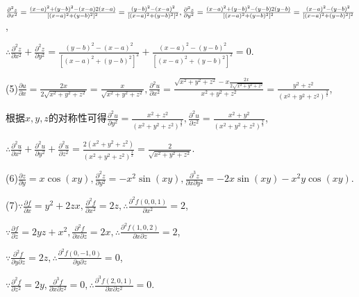 \documentclass[12pt,UTF8]{ctexart}
\begin{document}
\begin{enumerate}
$\frac{\partial^2z}{\partial x^2}=\frac{(x-a)^2+(y-b)^2-(x-a)2(x-a)}{[(x-a)^2+(y-b)^2]^2}=\frac{(y-b)^2-(x-a)^2}{[(x-a)^2+(y-b)^2]^2},\\
\frac{\partial^2z}{\partial y^2}=\frac{(x-a)^2+(y-b)^2-(y-b)2(y-b)}{[(x-a)^2+(y-b)^2]^2}=\frac{(x-a)^2-(y-b)^2}{[(x-a)^2+(y-b)^2]^2}$,

$\therefore\frac{\partial^2z}{\partial x^2}+\frac{\partial^2z}{\partial y^2}=\frac{(y-b)^2-(x-a)^2}{[(x-a)^2+(y-b)^2]^2}+\frac{(x-a)^2-(y-b)^2}{[(x-a)^2+(y-b)^2]^2}=0$.

(5)$\frac{\partial u}{\partial x}=\frac{2x}{2\sqrt{x^2+y^2+z^2}}=\frac x{\sqrt{x^2+y^2+z^2}},\frac{\partial^2u}{\partial x^2}=\frac{\sqrt{x^2+y^2+z^2}-x\frac{2x}{2\sqrt{x^2+y^2+z^2}}}{x^2+y^2+z^2}=\frac{y^2+z^2}{(x^2+y^2+z^2)^{\frac32}}$,

根据$x,y,z$的对称性可得$\frac{\partial^2u}{\partial y^2}=\frac{x^2+z^2}{(x^2+y^2+z^2)^{\frac32}},\frac{\partial^2u}{\partial z^2}=\frac{x^2+y^2}{(x^2+y^2+z^2)^{\frac32}}$,

$\therefore\frac{\partial^2u}{\partial x^2}+\frac{\partial^2u}{\partial y^2}+\frac{\partial^2u}{\partial z^2}=\frac{2(x^2+y^2+z^2)}{(x^2+y^2+z^2)^{\frac32}}=\frac2{\sqrt{x^2+y^2+z^2}}$.

(6)$\frac{\partial z}{\partial y}=x\cos(xy),\frac{\partial^2z}{\partial y^2}=-x^2\sin(xy),\frac{\partial^3z}{\partial x\partial y^2}=-2x\sin(xy)-x^2y\cos(xy)$.

(7)$\because\frac{\partial f}{\partial x}=y^2+2zx,\frac{\partial^2f}{\partial x^2}=2z,\therefore\frac{\partial^2f(0,0,1)}{\partial x^2}=2$,

$\because\frac{\partial f}{\partial z}=2yz+x^2,\frac{\partial^2f}{\partial x\partial z}=2x,\therefore\frac{\partial^2f(1,0,2)}{\partial x\partial z}=2$,

$\because\frac{\partial^2f}{\partial y\partial z}=2z,\therefore\frac{\partial^2f(0,-1,0)}{\partial y\partial z}=0$,

$\because\frac{\partial^2f}{\partial z^2}=2y,\frac{\partial^3f}{\partial x\partial z^2}=0,\therefore\frac{\partial^3f(2,0,1)}{\partial x\partial z^2}=0$.
\end{enumerate}
\end{document}
